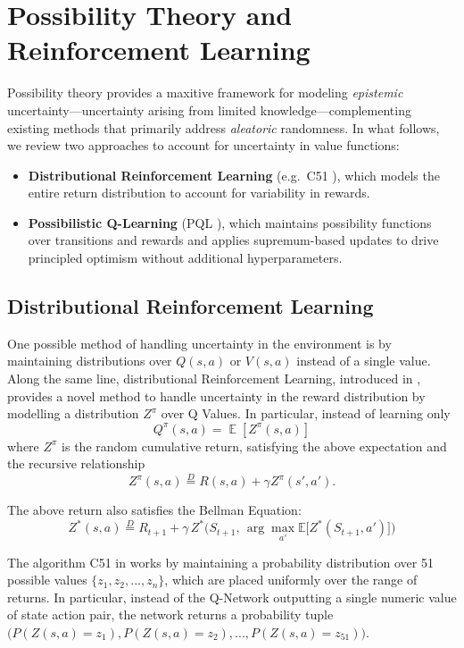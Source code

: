 \documentclass[11pt,a4paper]{report}
\DeclareMathOperator{\EX}{\mathbb{E}}
\begin{document}
\section{Possibility Theory and Reinforcement Learning}
Possibility theory provides a maxitive framework for modeling \emph{epistemic} uncertainty—uncertainty arising from limited knowledge—complementing existing methods that primarily address \emph{aleatoric} randomness. In what follows, we review two approaches to account for uncertainty in value functions:

\begin{itemize}
  \item \textbf{Distributional Reinforcement Learning} (e.g.\ C51 \cite{bellemare2017}), which models the entire return distribution to account for variability in rewards.
  \item \textbf{Possibilistic Q-Learning} (PQL \cite{thomas2025}), which maintains possibility functions over transitions and rewards and applies supremum-based updates to drive principled optimism without additional hyperparameters.
\end{itemize}

\subsection{Distributional Reinforcement Learning}
One possible method of handling uncertainty in the environment is by maintaining distributions over $Q(s,a)$ or $V(s,a)$ instead of a single value. Along the same line, distributional Reinforcement Learning, introduced in \cite{bellemare2017}, provides a novel method to handle uncertainty in the reward distribution by modelling a distribution $Z^\pi$ over Q Values. In particular, instead of learning only 
\[
  Q^\pi(s,a) = \EX[Z^\pi(s,a)]
\]
where $Z^\pi$ is the random cumulative return, satisfying the above expectation and the recursive relationship 
\[Z^\pi(s,a) \overset{D}{=} R(s,a) + \gamma Z^\pi(s', a').\]

The above return also satisfies the Bellman Equation:
\[
Z^*(s,a) \overset{D}{=} R_{t+1} + \gamma \, Z^*\Big(S_{t+1}, \, \arg\max_{a'} \mathbb{E}\big[Z^*(S_{t+1}, a')\big]\Big)
\]
\par
The algorithm C51 in \cite{bellemare2017} works by maintaining a probability distribution over 51 possible values $\{z_1, z_2, ..., z_n\}$, which are placed uniformly over the range of returns. In particular, instead of the Q-Network outputting a single numeric value of state action pair, the network returns a probability tuple $\bigl(P(Z(s,a) = z_1),P(Z(s,a) = z_2), ... , P(Z(s,a) = z_{51})\bigl)$. 
\end{document}
